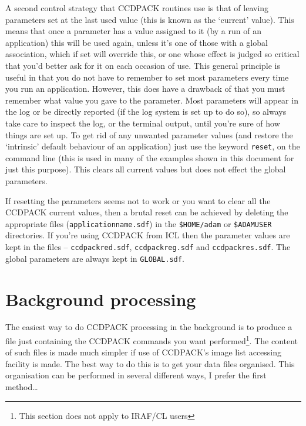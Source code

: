 \documentclass[twoside,11pt]{article}
\newcommand{\xlabel}[1]{}
\renewcommand{\_}{\texttt{\symbol{95}}}
\newcommand{\text}[1]{{\small \tt #1}}
\begin{document}
A second control strategy that CCDPACK routines use is that of leaving
parameters set at the last used value (this is known as the `current'
value).
This means that once a parameter has a value assigned to it (by a run
of an application) this will be used again, unless it's one of those
with a global association, which if set will override this, or one
whose effect is judged so critical that you'd better ask for it on
each occasion of use.
This general principle is useful in that you do not have to remember
to set most parameters every time you run an application.
However, this does have a drawback of that you must remember what
value you gave to the parameter.
Most parameters will appear in the log or be directly reported (if
the log system is set up to do so), so always take care to inspect
the log, or the terminal output, until you're sure of how things
are set up.
To get rid of any unwanted parameter values (and restore the
`intrinsic' default behaviour of an application) just use the keyword
\text{reset}, on the command line (this is used in many of the
examples shown in this document for just this purpose).
This clears all current values but does not effect the global
parameters.

If resetting the parameters seems not to work or you want to clear all
the CCDPACK current values, then a brutal reset can be achieved
by deleting the appropriate files (\text{application\_name.sdf}) in the
\text{\$HOME/adam} or \text{\$ADAM\_USER} directories. If you're using
CCDPACK from ICL then the parameter values are kept in the
files -- \text{ccdpack\_red.sdf}, \text{ccdpack\_reg.sdf} and
\text{ccdpack\_res.sdf}. The global parameters are always kept in
\text{GLOBAL.sdf}.

\section{\xlabel{backgroundprocessing}Background processing
         \label{backgroundprocessing}}

The easiest way to do CCDPACK processing in the background is to
produce a file just containing the CCDPACK commands you want
performed\footnote{This section does not apply to IRAF/CL users}. The
content of such files is made much simpler if use of CCDPACK's image
list accessing facility is made. The best way to do this is to get
your data files organised. This organisation can be performed in
several different ways, I prefer the first method\ldots
\end{document}

